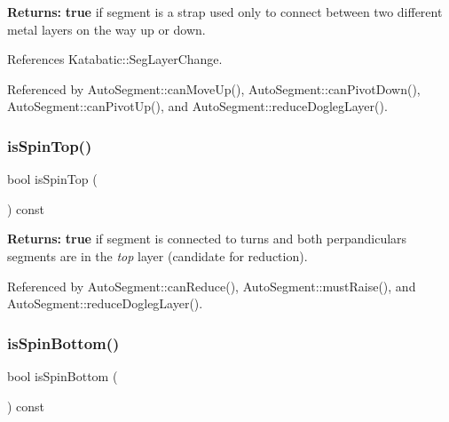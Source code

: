 {\bfseries Returns\+:} {\bfseries true} if segment is a strap used only to connect between two different metal layers on the way up or down. 

References Katabatic\+::\+Seg\+Layer\+Change.



Referenced by Auto\+Segment\+::can\+Move\+Up(), Auto\+Segment\+::can\+Pivot\+Down(), Auto\+Segment\+::can\+Pivot\+Up(), and Auto\+Segment\+::reduce\+Dogleg\+Layer().

\mbox{\label{classKatabatic_1_1AutoSegment_a3776b8258ab6544c9551d0714fcc75d2}} 
\subsubsection{\texorpdfstring{is\+Spin\+Top()}{isSpinTop()}}
{\footnotesize\ttfamily bool is\+Spin\+Top (\begin{DoxyParamCaption}{ }\end{DoxyParamCaption}) const\hspace{0.3cm}{\ttfamily [inline]}}

{\bfseries Returns\+:} {\bfseries true} if segment is connected to turns and both perpandiculars segments are in the {\itshape top} layer (candidate for reduction). 

Referenced by Auto\+Segment\+::can\+Reduce(), Auto\+Segment\+::must\+Raise(), and Auto\+Segment\+::reduce\+Dogleg\+Layer().

\mbox{\label{classKatabatic_1_1AutoSegment_ab786dbdb67ea727369b1a988497c01d1}} 
\subsubsection{\texorpdfstring{is\+Spin\+Bottom()}{isSpinBottom()}}
{\footnotesize\ttfamily bool is\+Spin\+Bottom (\begin{DoxyParamCaption}{ }\end{DoxyParamCaption}) const\hspace{0.3cm}{\ttfamily [inline]}}

